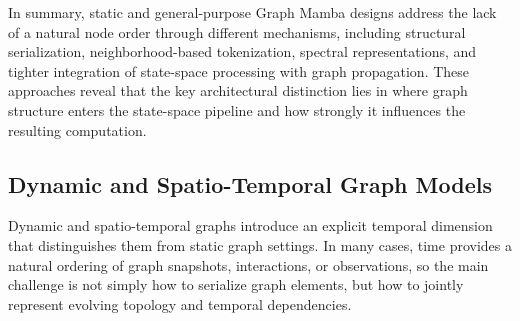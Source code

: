 \documentclass[acmsmall]{acmart}
\begin{document}
In summary, static and general-purpose Graph Mamba designs address the lack of a natural node order through different mechanisms, including structural serialization, neighborhood-based tokenization, spectral representations, and tighter integration of state-space processing with graph propagation. These approaches reveal that the key architectural distinction lies in where graph structure enters the state-space pipeline and how strongly it influences the resulting computation.
 


\subsection{Dynamic and Spatio-Temporal Graph Models}
\label{subsec:dynamic-models}

Dynamic and spatio-temporal graphs introduce an explicit temporal dimension
that distinguishes them from static graph settings. In many cases, time
provides a natural ordering of graph snapshots, interactions, or observations,
so the main challenge is not simply how to serialize graph elements, but how
to jointly represent evolving topology and temporal dependencies.
\end{document}
